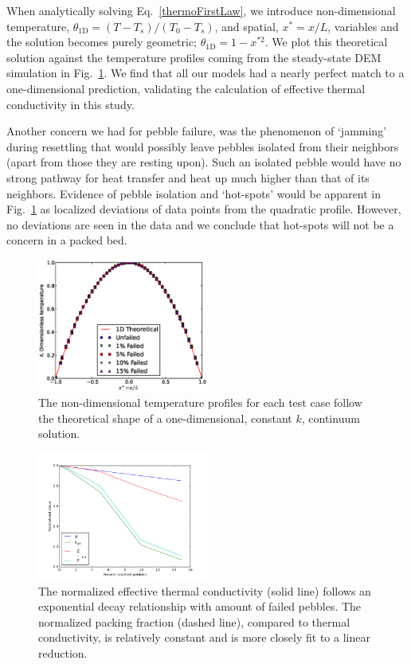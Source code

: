 When analytically solving Eq.~\ref{thermoFirstLaw}, we introduce non-dimensional temperature, $\theta_\text{1D} = (T -T_s)/(T_0-T_s)$, and spatial, $x^* = x/L$, variables and the solution becomes purely geometric; $\theta_\text{1D} = 1-x^{*2}$. We plot this theoretical solution against the temperature profiles coming from the steady-state DEM simulation in Fig.~\ref{fig:tempProfile}. We find that all our models had a nearly perfect match to a one-dimensional prediction, validating the calculation of effective thermal conductivity in this study. 

Another concern we had for pebble failure, was the phenomenon of `jamming' during resettling that would possibly leave pebbles isolated from their neighbors (apart from those they are resting upon). Such an isolated pebble would have no strong pathway for heat transfer and heat up much higher than that of its neighbors. Evidence of pebble isolation and `hot-spots' would be apparent in Fig.~\ref{fig:tempProfile} as localized deviations of data points from the quadratic profile. However, no deviations are seen in the data and we conclude that hot-spots will not be a concern in a packed bed.

\begin{figure}[t]
	\centering
	\includegraphics[width=0.5\textwidth]{chapters/figures/tempProfiles}
	\caption{The non-dimensional temperature profiles for each test case follow the theoretical shape of a one-dimensional, constant $k$, continuum solution.}
\label{fig:tempProfile}
\end{figure}



\begin{figure}[t]
	\centering
	\includegraphics[width=0.5\textwidth]{chapters/figures/kEff_packingFraction}
	\caption{The normalized effective thermal conductivity (solid line) follows an exponential decay relationship with amount of failed pebbles. The normalized packing fraction (dashed line), compared to thermal conductivity, is relatively constant and is more closely fit to a linear reduction.}
\label{fig:packingFraction}
\end{figure}

